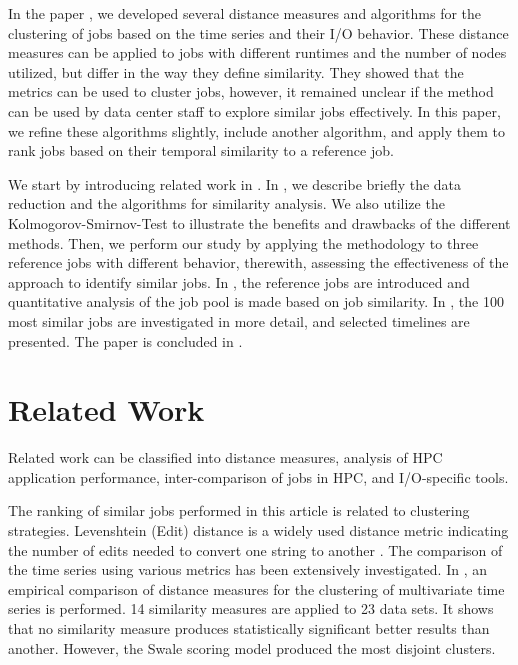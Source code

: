 \documentclass{jhps}
\begin{document}
In the paper \cite{Eugen20HPS}, we developed several distance measures and algorithms for the clustering of jobs based on the time series and their I/O behavior.
These distance measures can be applied to jobs with different runtimes and the number of nodes utilized, but differ in the way they define similarity.
They showed that the metrics can be used to cluster jobs, however, it remained unclear if the method can be used by data center staff to explore similar jobs effectively.
In this paper, we refine these algorithms slightly, include another algorithm, and apply them to rank jobs based on their temporal similarity to a reference job.

We start by introducing related work in .
In , we describe briefly the data reduction and the algorithms for similarity analysis.
We also utilize the Kolmogorov-Smirnov-Test to illustrate the benefits and drawbacks of the different methods.
Then, we perform our study by applying the methodology to three reference jobs with different behavior, therewith, assessing the effectiveness of the approach to identify similar jobs.
In , the reference jobs are introduced and quantitative analysis of the job pool is made based on job similarity.
In , the 100 most similar jobs are investigated in more detail, and selected timelines are presented.
The paper is concluded in .

\section{Related Work}
\label{sec:relwork}

Related work can be classified into distance measures, analysis of HPC application performance, inter-comparison of jobs in HPC, and I/O-specific tools.

The ranking of similar jobs performed in this article is related to clustering strategies.
Levenshtein (Edit) distance is a widely used distance metric indicating the number of edits needed to convert one string to another \cite{navarro2001guided}.
The comparison of the time series using various metrics has been extensively investigated.
In \cite{khotanlou2018empirical}, an empirical comparison of distance measures for the clustering of multivariate time series is performed.
14 similarity measures are applied to 23 data sets.
It shows that no similarity measure produces statistically significant better results than another.
However, the Swale scoring model \cite{morse2007efficient} produced the most disjoint clusters.
\end{document}
